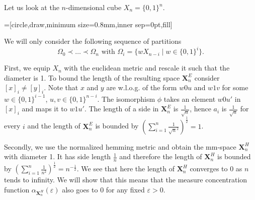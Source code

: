 \begin{example}
	Let us look at the $n$-dimensional cube $X_n=\{0,1\}^n$.
				
	\begin{center}
		=[circle,draw,minimum size=0.8mm,inner sep=0pt,fill]
	\end{center}
	We will only consider the following sequence of partitions
	\[\Omega_0\prec\dots\prec\Omega_n\text{ with }\Omega_i=\{wX_{n-i}\mid w\in\{0,1\}^i\}.\]
				
	First, we equip $X_n$ with the euclidean metric and rescale it such that the diameter is 1. To bound the length of the resulting space $\boldsymbol X^E_n$ consider $[x]_i\neq[y]_i$. Note that $x$ and $y$ are w.l.o.g. of the form $w0u$ and $w1v$ for some $w\in\{0,1\}^{i-1}$, $u,v\in\{0,1\}^{n-i}$. The isomorphism $\phi$ takes an element $w0u'$ in $[x]_i$ and maps it to $w1u'$. The length of a side in $\boldsymbol X^E_n$ is $\frac{1}{\sqrt{n}}$, hence $a_i$ is $\frac{1}{\sqrt{n}}$ for every $i$ and the length of $\boldsymbol{X}^E_n$ is bounded by $(\sum_{i=1}^{n}\frac{1}{\sqrt{n}^2})^{\frac{1}{2}}=1$.
				
	Secondly, we use the normalized hemming metric and obtain the mm-space $\boldsymbol{X}^H_n$ with diameter 1. It has side length $\frac{1}{n}$ and therefore the length of $\boldsymbol{X}^H_n$ is bounded by $(\sum_{i=1}^{n}\frac{1}{n^2})^{\frac{1}{2}}=n^{-\frac{1}{2}}$. We see that here the length of $\boldsymbol{X}^H_n$ converges to 0 as $n$ tends to infinity. We will show that this means that the measure concentration function $\alpha_{\boldsymbol{X}^H_n}(\varepsilon)$ also goes to 0 for any fixed $\varepsilon>0$. 
\end{example}
		
